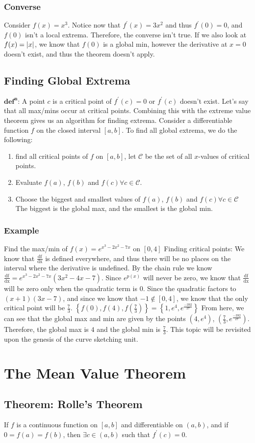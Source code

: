 \documentclass[oneside]{book}
\newcommand\tab[1][1cm]{\hspace*{#1}}
\newcommand\nextline{\newline\tab}
\newcommand\thm[2]{\section*{Theorem: #1}\label{sec:#2}\addcontentsline{toc}{section}{Theorem: #1}}
\newcommand{\dfdx}{\frac{\text{df}}{\text{dx}}}
\begin{document}
\subsection{Converse}
\tab Consider $f(x)=x^3$. Notice now that $f^\prime(x)=3x^2$ and thus $f^\prime(0)=0$, and $f(0)$ isn't a local extrema. Therefore, the converse isn't true. If we also look at $f(x)=\lvert x\rvert$, we know that $f(0)$ is a global min, however the derivative at $x=0$ doesn't exist, and thus the theorem doesn't apply.
\section{Finding Global Extrema}
$\mathbf{\text{def}^{\text{n}}}$: A point $c$ is a critical point of $f^\prime(c)=0$ or $f^\prime(c)$ doesn't exist.\nextline
Let's say that all max/mins occur at critical points. Combining this with the extreme value theorem gives us an algorithm for finding extrema. \nextline
Consider a differentiable function $f$ on the closed interval $[a,b]$. To find all global extrema, we do the following:
\begin{enumerate}
\item find all critical points of $f$ on $[a,b]$, let $\mathcal{C}$ be the set of all $x$-values of critical points.
\item Evaluate $f(a)$, $f(b)$ and $f(c) \forall c\in\mathcal{C}$.
\item Choose the biggest and smallest values of $f(a)$, $f(b)$ and $f(c) \forall c\in\mathcal{C}$ \\
The biggest is the global max, and the smallest is the global min.
\end{enumerate}
\subsection{Example}
Find the max/min of $f(x)=e^{x^3-2x^2-7x}$ on $[0,4]$
\nextline
Finding critical points: We know that $\dfdx$ is defined everywhere, and thus there will be no places on the interval where the derivative is undefined.
\nextline
By the chain rule we know $\dfdx=e^{x^3-2x^2-7x}(3x^2-4x-7)$. Since $e^{p(x)}$ will never be zero, we know that $\dfdx$ will be zero only when the quadratic term is 0. Since the quadratic factors to $(x+1)(3x-7)$, and since we know that $-1\not\in[0,4]$, we know that the only critical point will be $\frac{7}{3}$.
\nextline
$\left\{f(0), f(4), f\left(\frac{7}{3}\right) \right\} = \left\{1, e^4, e^\frac{-392}{27} \right\}$
\nextline
From here, we can see that the global max and min are given by the points $(4,e^4)$, $\left(\frac{7}{3}, e^\frac{-392}{27}\right)$. Therefore, the global max is $4$ and the global min is $\frac{7}{3}$.	
\nextline
This topic will be revisited upon the genesis of the curve sketching unit.
\chapter{The Mean Value Theorem}
\thm{Rolle's Theorem}{RT}
\tab
If $f$ is a continuous function on $[a,b]$ and differentiable on $(a,b)$, and if $0=f(a)=f(b)$, then $\exists c\in (a,b)$ such that $f^\prime(c)=0$.
\end{document}
